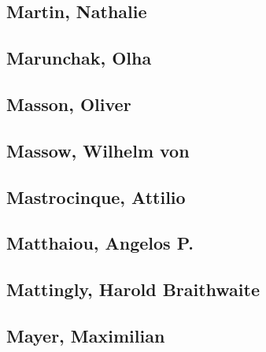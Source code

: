 \subsection[Martin, Nathalie (2)]{Martin, Nathalie}


\subsection[Marunchak, Olha (1)]{Marunchak, Olha}

\subsection[Masson, Oliver (2)]{Masson, Oliver}


\subsection[Massow, Wilhelm von (1)]{Massow, Wilhelm von}

\subsection[Mastrocinque, Attilio (2)]{Mastrocinque, Attilio}


\subsection[Matthaiou, Angelos P. (1)]{Matthaiou, Angelos P.}

\subsection[Mattingly, Harold Braithwaite (1)]{Mattingly, Harold Braithwaite}

\subsection[Mayer, Maximilian (1)]{Mayer, Maximilian}

